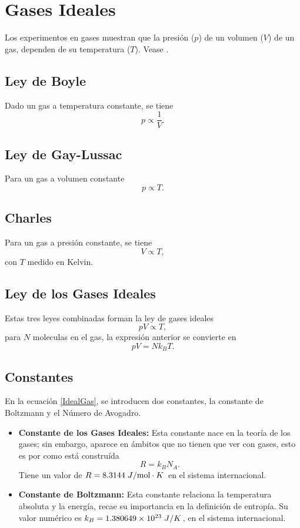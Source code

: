 \documentclass[conference]{IEEEtran}
\begin{document}
\section{Gases Ideales}
Los experimentos en gases muestran que la presión ($p$) de un volumen ($V$) de un gas, dependen de su temperatura ($T$). Vease \cite{blundell}.
\subsection{Ley de Boyle}
Dado un gas a temperatura constante, se tiene
	\begin{equation}
		p \propto \frac{1}{V} .\label{BoyleLaw}
	\end{equation}
	
\subsection{Ley de Gay-Lussac}
Para un gas a volumen constante
	\begin{equation}
		p \propto T. \label{GayLussacLaw}
	\end{equation}
\subsection{Charles}
Para un gas a presión constante, se tiene
	\begin{equation}
		V \propto T, \label{CharlesLaw}
	\end{equation}
con $T$ medido en Kelvin.
\subsection{Ley de los Gases Ideales}
Estas tres leyes combinadas forman la ley de gases ideales
	\begin{equation}
		pV \propto T, \label{LawsCombined}
	\end{equation}
para $N$ moleculas en el gas, la expresión anterior se convierte en
	\begin{equation}
		pV = Nk_B T. \label{IdealGas}		
	\end{equation}
\subsection{Constantes}
En la ecuación \eqref{IdealGas}, se introducen dos constantes, la constante de Boltzmann y el Número de Avogadro. 
	\begin{itemize}
		\item {\bf Constante de los Gases Ideales: } Esta constante nace en la teoría de los gases; sin embargo, aparece en ámbitos que no tienen que ver con gases, esto es por como está construída
			\begin{equation}
				R = k_B N_A .\label{constGasIdeales}
			\end{equation}
		Tiene un valor de $R = 8.3144 \flatfrac{J}{\text{mol} \cdot K}$ en el sistema internacional.
		\item {\bf Constante de Boltzmann: } Esta constante relaciona la temperatura absoluta y la energía, recae su importancia en la definición de entropía. Su valor numérico es $k_B = 1.380649 \times 10 ^{23} \flatfrac{J}{K}$, en el sistema internacional.
	\end{itemize}
\end{document}
